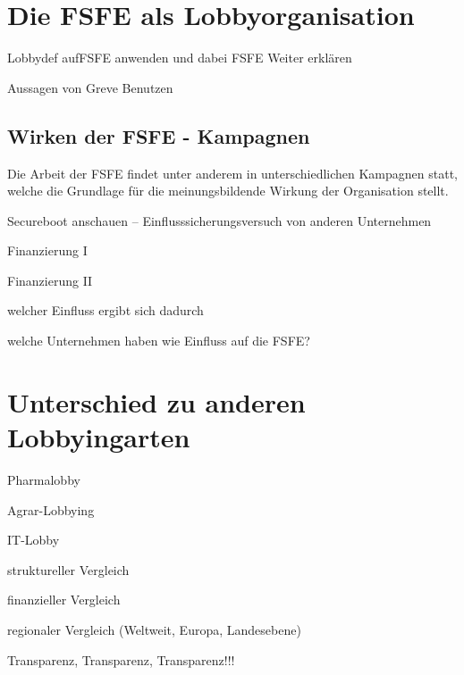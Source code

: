 

\section{Die FSFE als Lobbyorganisation}
\begin{itemize*}
    \item Lobbydef aufFSFE  anwenden und dabei FSFE Weiter erklären
    \item Aussagen von Greve Benutzen \cite{PLGreveInterView}
\end{itemize*}

\subsection{Wirken der FSFE - Kampagnen}
Die Arbeit der FSFE findet unter anderem in unterschiedlichen Kampagnen statt, 
welche die Grundlage für die meinungsbildende Wirkung der Organisation stellt.
\begin{itemize*}
    \item Secureboot anschauen -- Einflusssicherungsversuch von anderen
    Unternehmen
\end{itemize*}

\begin{itemize*}
\item Finanzierung I
\item Finanzierung II
\item welcher Einfluss ergibt sich dadurch
\item welche Unternehmen haben wie Einfluss auf die FSFE?
\end{itemize*}

\section{Unterschied zu anderen Lobbyingarten}
\begin{itemize*}
\item Pharmalobby \cite{BeckLobbyGesundwe}
\item Agrar-Lobbying
\item IT-Lobby
\item struktureller Vergleich
\item finanzieller Vergleich
\item regionaler Vergleich (Weltweit, Europa, Landesebene)
\item Transparenz, Transparenz, Transparenz!!!
\end{itemize*}

